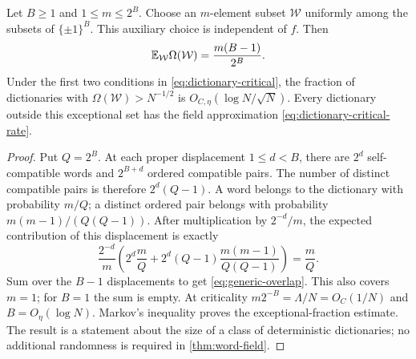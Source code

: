 \begin{corollary}\label{cor:generic-dictionaries}
Let $B\ge1$ and $1\le m\le2^B$. Choose an $m$-element subset $\mathcal W$
uniformly among the subsets of $\{\pm1\}^B$.
This auxiliary choice is independent of $f$. Then
\begin{equation}\label{eq:generic-overlap}
 \mathbb E_{\mathcal W}\Omega(\mathcal W)=\frac{m(B-1)}{2^B}.
\end{equation}
Under the first two conditions in \eqref{eq:dictionary-critical}, the
fraction of dictionaries with $\Omega(\mathcal W)>N^{-1/2}$ is
$O_{C,\eta}(\log N/\sqrt N)$. Every dictionary outside this exceptional
set has the field approximation \eqref{eq:dictionary-critical-rate}.
\end{corollary}
\begin{proof}
Put $Q=2^B$. At each proper displacement $1\le d<B$, there are
$2^d$ self-compatible words and $2^{B+d}$ ordered compatible pairs.
The number of distinct compatible pairs is therefore $2^d(Q-1)$.
A word belongs to the dictionary with probability $m/Q$; a distinct
ordered pair belongs with probability $m(m-1)/(Q(Q-1))$.
After multiplication by $2^{-d}/m$, the expected contribution of this
displacement is exactly
\[
 \frac{2^{-d}}m\left(2^d\frac mQ
       +2^d(Q-1)\frac{m(m-1)}{Q(Q-1)}\right)=\frac mQ.
\]
Sum over the $B-1$ displacements to get \eqref{eq:generic-overlap}.
This also covers $m=1$; for $B=1$ the sum is empty.
At criticality $m2^{-B}=\Lambda/N=O_C(1/N)$ and $B=O_\eta(\log N)$.
Markov's inequality proves the exceptional-fraction estimate. The result
is a statement about the size of a class of deterministic dictionaries;
no additional randomness is required in \cref{thm:word-field}.
\end{proof}

